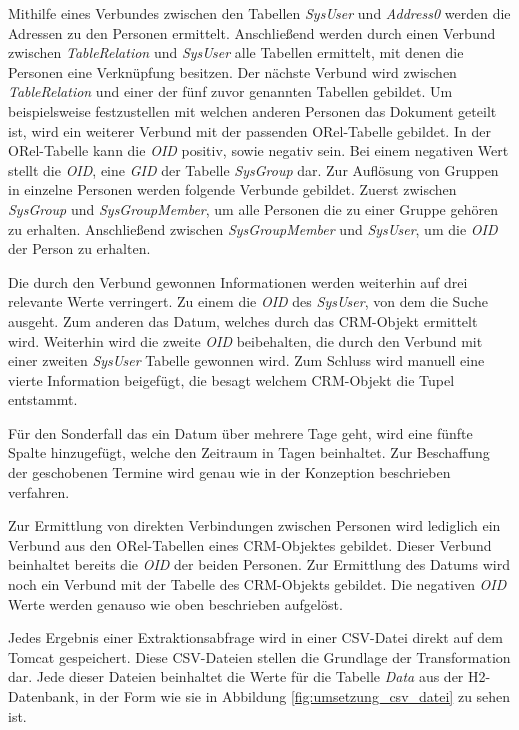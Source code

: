 Mithilfe eines Verbundes zwischen den Tabellen \textit{SysUser} und \textit{Address0} werden die Adressen zu den Personen ermittelt. Anschließend werden durch einen Verbund zwischen \textit{TableRelation} und \textit{SysUser} alle Tabellen ermittelt, mit denen die Personen eine Verknüpfung besitzen. Der nächste Verbund wird zwischen \textit{TableRelation} und einer der fünf zuvor genannten Tabellen gebildet. Um beispielsweise festzustellen mit welchen anderen Personen das Dokument geteilt ist, wird ein weiterer Verbund mit der passenden ORel-Tabelle gebildet. In der ORel-Tabelle kann die \textit{OID} positiv, sowie negativ sein. Bei einem negativen Wert stellt die \textit{OID}, eine \textit{GID} der Tabelle \textit{SysGroup} dar. Zur Auflösung von Gruppen in einzelne Personen werden folgende Verbunde gebildet. Zuerst zwischen \textit{SysGroup} und \textit{SysGroupMember}, um alle Personen die zu einer Gruppe gehören zu erhalten. Anschließend zwischen \textit{SysGroupMember} und \textit{SysUser}, um die \textit{OID} der Person zu erhalten. 

Die durch den Verbund gewonnen Informationen werden weiterhin auf drei relevante Werte verringert. Zu einem die \textit{OID} des \textit{SysUser}, von dem die Suche ausgeht. Zum anderen das Datum, welches durch das CRM-Objekt ermittelt wird. Weiterhin wird die zweite \textit{OID} beibehalten, die durch den Verbund mit einer zweiten \textit{SysUser} Tabelle gewonnen wird. Zum Schluss wird manuell eine vierte Information beigefügt, die besagt welchem CRM-Objekt die Tupel entstammt. 

Für den Sonderfall das ein Datum über mehrere Tage geht, wird eine fünfte Spalte hinzugefügt, welche den Zeitraum in Tagen beinhaltet. Zur Beschaffung der geschobenen Termine wird genau wie in der Konzeption beschrieben verfahren.

Zur Ermittlung von direkten Verbindungen zwischen Personen wird lediglich ein Verbund aus den ORel-Tabellen eines CRM-Objektes gebildet. Dieser Verbund beinhaltet bereits die \textit{OID} der beiden Personen. Zur Ermittlung des Datums wird noch ein Verbund mit der Tabelle des CRM-Objekts gebildet. Die negativen \textit{OID} Werte werden genauso wie oben beschrieben aufgelöst. 

Jedes Ergebnis einer Extraktionsabfrage wird in einer CSV-Datei direkt auf dem Tomcat gespeichert. Diese CSV-Dateien stellen die Grundlage der Transformation dar. Jede dieser Dateien beinhaltet die Werte für die Tabelle \textit{Data} aus der H2-Datenbank, in der Form wie sie in Abbildung \ref{fig:umsetzung_csv_datei} zu sehen ist. 

